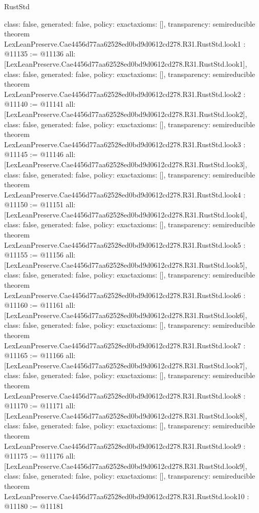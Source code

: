 \begin{lexlean}{RustStd}
\begin{coremodule}
{  class: false,
  generated: false,
  policy: exact{axioms: []},
  transparency: semireducible
}
theorem LexLeanPreserve.Cae4456d77aa62528ed0bd9d0612cd278.R31.RustStd.look1 : @11135 := @11136 {
  all: [LexLeanPreserve.Cae4456d77aa62528ed0bd9d0612cd278.R31.RustStd.look1],
  class: false,
  generated: false,
  policy: exact{axioms: []},
  transparency: semireducible
}
theorem LexLeanPreserve.Cae4456d77aa62528ed0bd9d0612cd278.R31.RustStd.look2 : @11140 := @11141 {
  all: [LexLeanPreserve.Cae4456d77aa62528ed0bd9d0612cd278.R31.RustStd.look2],
  class: false,
  generated: false,
  policy: exact{axioms: []},
  transparency: semireducible
}
theorem LexLeanPreserve.Cae4456d77aa62528ed0bd9d0612cd278.R31.RustStd.look3 : @11145 := @11146 {
  all: [LexLeanPreserve.Cae4456d77aa62528ed0bd9d0612cd278.R31.RustStd.look3],
  class: false,
  generated: false,
  policy: exact{axioms: []},
  transparency: semireducible
}
theorem LexLeanPreserve.Cae4456d77aa62528ed0bd9d0612cd278.R31.RustStd.look4 : @11150 := @11151 {
  all: [LexLeanPreserve.Cae4456d77aa62528ed0bd9d0612cd278.R31.RustStd.look4],
  class: false,
  generated: false,
  policy: exact{axioms: []},
  transparency: semireducible
}
theorem LexLeanPreserve.Cae4456d77aa62528ed0bd9d0612cd278.R31.RustStd.look5 : @11155 := @11156 {
  all: [LexLeanPreserve.Cae4456d77aa62528ed0bd9d0612cd278.R31.RustStd.look5],
  class: false,
  generated: false,
  policy: exact{axioms: []},
  transparency: semireducible
}
theorem LexLeanPreserve.Cae4456d77aa62528ed0bd9d0612cd278.R31.RustStd.look6 : @11160 := @11161 {
  all: [LexLeanPreserve.Cae4456d77aa62528ed0bd9d0612cd278.R31.RustStd.look6],
  class: false,
  generated: false,
  policy: exact{axioms: []},
  transparency: semireducible
}
theorem LexLeanPreserve.Cae4456d77aa62528ed0bd9d0612cd278.R31.RustStd.look7 : @11165 := @11166 {
  all: [LexLeanPreserve.Cae4456d77aa62528ed0bd9d0612cd278.R31.RustStd.look7],
  class: false,
  generated: false,
  policy: exact{axioms: []},
  transparency: semireducible
}
theorem LexLeanPreserve.Cae4456d77aa62528ed0bd9d0612cd278.R31.RustStd.look8 : @11170 := @11171 {
  all: [LexLeanPreserve.Cae4456d77aa62528ed0bd9d0612cd278.R31.RustStd.look8],
  class: false,
  generated: false,
  policy: exact{axioms: []},
  transparency: semireducible
}
theorem LexLeanPreserve.Cae4456d77aa62528ed0bd9d0612cd278.R31.RustStd.look9 : @11175 := @11176 {
  all: [LexLeanPreserve.Cae4456d77aa62528ed0bd9d0612cd278.R31.RustStd.look9],
  class: false,
  generated: false,
  policy: exact{axioms: []},
  transparency: semireducible
}
theorem LexLeanPreserve.Cae4456d77aa62528ed0bd9d0612cd278.R31.RustStd.look10 : @11180 := @11181 {
}
\end{coremodule}
\end{lexlean}
